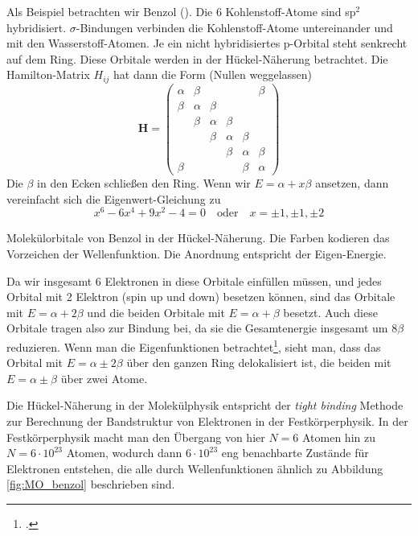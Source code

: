 Als Beispiel betrachten wir Benzol (). Die 6 Kohlenstoff-Atome sind sp$^2$ hybridisiert. $\sigma$-Bindungen verbinden die Kohlenstoff-Atome untereinander und mit den Wasserstoff-Atomen. Je ein nicht hybridisiertes p-Orbital steht senkrecht auf dem Ring. Diese Orbitale werden in der Hückel-Näherung betrachtet. Die Hamilton-Matrix $H_{ij}$ hat dann die Form (Nullen weggelassen)
\begin{equation}
\mathbf{H} = 
 \begin{pmatrix}
  \alpha  & \beta &  &  &  & \beta \\
  \beta & \alpha  & \beta & & & \\
  & \beta & \alpha  & \beta & & \\
 &  & \beta & \alpha & \beta & \\
&  &  & \beta & \alpha & \beta \\
\beta & &  &  & \beta & \alpha 
 \end{pmatrix} 
\end{equation}
Die $\beta$ in den Ecken schließen den Ring.
Wenn wir $E = \alpha + x \beta$ ansetzen, dann vereinfacht sich die Eigenwert-Gleichung zu 
\begin{equation}
x^6 - 6 x^4 + 9x^2 - 4 = 0 \quad \text{oder} \quad x = \pm 1, \pm 1, \pm 2
\end{equation}
%
\begin{marginfigure}[150mm]
\caption{Molekülorbitale von Benzol in der Hückel-Näherung. Die Farben kodieren das Vorzeichen der Wellenfunktion. Die Anordnung entspricht der Eigen-Energie.\label{fig:MO_benzol}}
\end{marginfigure}
%
Da wir insgesamt 6 Elektronen in diese Orbitale einfüllen müssen, und jedes Orbital mit 2 Elektron (spin up und down) besetzen können, sind das Orbitale mit $E=\alpha + 2 \beta$ und die beiden Orbitale mit $E = \alpha + \beta$ besetzt. Auch diese Orbitale tragen also zur Bindung bei, da sie die Gesamtenergie insgesamt um $8\beta$ reduzieren. Wenn man die Eigenfunktionen betrachtet\footcite{Atkins}, sieht man, dass  das Orbital mit $E=\alpha \pm 2 \beta$  über den ganzen Ring delokalisiert ist, die beiden mit $E = \alpha \pm \beta$  über zwei  Atome.

Die Hückel-Näherung in der Molekülphysik entspricht der \emph{tight binding} Methode zur Berechnung der Bandstruktur von Elektronen  in der Festkörperphysik. In der Festkörperphysik macht man den Übergang von hier $N=6$ Atomen hin zu $N= 6 \cdot 10^{23}$ Atomen, wodurch dann  $6 \cdot 10^{23}$ eng benachbarte Zustände für Elektronen entstehen, die alle durch Wellenfunktionen ähnlich zu Abbildung \ref{fig:MO_benzol} beschrieben sind.

